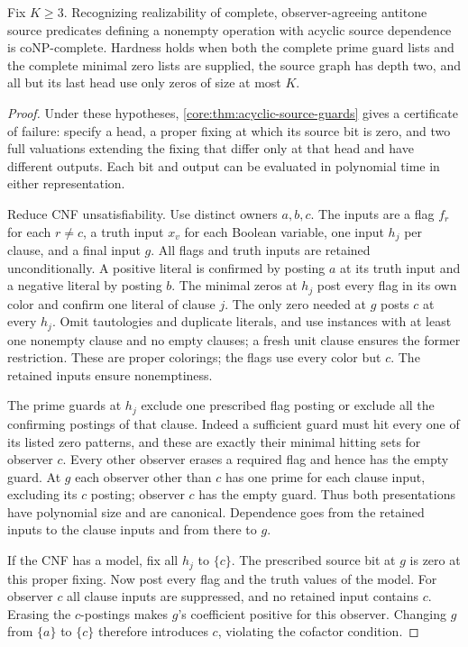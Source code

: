 \begin{theorem}
\label{core:thm:complete-acyclic-guard-complexity}
Fix $K\ge3$. Recognizing realizability of complete, observer-agreeing
antitone source predicates defining a nonempty operation with acyclic
source dependence is coNP-complete. Hardness holds when both the complete
prime guard lists and the complete minimal zero lists are supplied, the
source graph has depth two, and all but its last head use only zeros
of size at most $K$.
\end{theorem}
\begin{proof}
Under these hypotheses, \cref{core:thm:acyclic-source-guards} gives
a certificate of failure: specify a head, a proper fixing at which
its source bit is zero, and two full valuations extending the fixing
that differ only at that head and have different outputs. Each bit and
output can be evaluated in polynomial time in either representation.

Reduce CNF unsatisfiability. Use distinct owners $a,b,c$. The inputs
are a flag $f_r$ for each $r\ne c$, a truth input $x_v$ for each
Boolean variable, one input $h_j$ per clause, and a final input $g$.
All flags and truth inputs are retained unconditionally. A positive
literal is confirmed by posting $a$ at its truth input and a negative
literal by posting $b$. The minimal zeros at $h_j$ post every flag
in its own color and confirm one literal of clause $j$. The only
zero needed at $g$ posts $c$ at every $h_j$. Omit tautologies and duplicate literals, and use instances with at
least one nonempty clause and no empty clauses; a fresh unit clause
ensures the former restriction. These are
proper colorings; the flags use every color but $c$. The retained
inputs ensure nonemptiness.

The prime guards at $h_j$ exclude one prescribed flag posting or
exclude all the confirming postings of that clause. Indeed a sufficient
guard must hit every one of its listed zero patterns, and these are
exactly their minimal hitting sets for observer $c$. Every other
observer erases a required flag and hence has the empty guard.
At $g$ each observer other than $c$ has one prime for each clause
input, excluding its $c$ posting; observer $c$ has the empty guard. Thus both presentations
have polynomial size and are canonical. Dependence goes from the
retained inputs to the clause inputs and from there to $g$.

If the CNF has a model, fix all $h_j$ to $\{c\}$. The prescribed
source bit at $g$ is zero at this proper fixing. Now post every flag
and the truth values of the model. For observer $c$ all clause inputs
are suppressed, and no retained input contains $c$. Erasing the
$c$-postings makes $g$'s coefficient positive for this observer.
Changing $g$ from $\{a\}$ to $\{c\}$ therefore introduces $c$,
violating the cofactor condition.


\end{proof}
